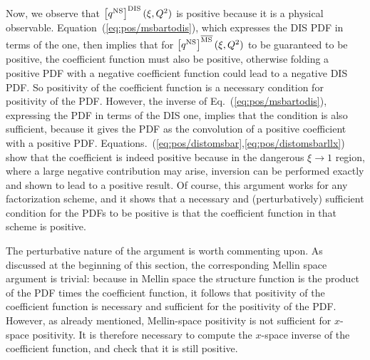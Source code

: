 Now, we observe that
$\left[{q^{{\textrm{NS}}}}\right]^{\textrm{DIS}}(\xi,Q^2)$ is positive because it is a physical
observable. Equation~(\ref{eq:pos/msbartodis}), which expresses the DIS
PDF in terms of the \msbar{} one, then  implies that  for
$\left[{q^{{\textrm{NS}}}}\right]^{{\overline{\textrm{MS}}}}(\xi,Q^2)$  to be guaranteed to be
positive,
the \msbar{} coefficient function  must also be positive, otherwise
folding a positive \msbar{}  PDF with a negative coefficient function
could lead to a negative DIS PDF. So positivity of the \msbar{}
coefficient function
is a necessary condition for positivity of the \msbar{} PDF.
However, the inverse of  Eq.~(\ref{eq:pos/msbartodis}), expressing the
\msbar{} PDF in terms of the DIS one, implies that the condition is
also sufficient, because it gives the \msbar{} PDF as the convolution
of a positive coefficient with a positive PDF. Equations.~(\ref{eq:pos/distomsbar},\ref{eq:pos/distomsbarllx}) show that the coefficient is indeed
positive because in the dangerous
$\xi\to 1$ region, where  a large negative contribution may arise,
inversion can be performed exactly and shown to lead to a positive
result.
Of
course, this argument works for any factorization scheme, and it shows
that a necessary and (perturbatively) sufficient condition for the
PDFs to be positive is that the coefficient function in that scheme is positive.

The perturbative nature of the argument is worth commenting
upon. As discussed at the beginning of this section, the corresponding
Mellin space argument is trivial: because in Mellin space the
structure function is the product of the PDF times the coefficient
function, it follows that positivity of the coefficient function is
necessary and sufficient for the positivity of the PDF. However, as
already mentioned,
Mellin-space positivity is not sufficient for $x$-space positivity. It
is therefore necessary to compute the $x$-space inverse of the
coefficient function, and check that it is still positive.

